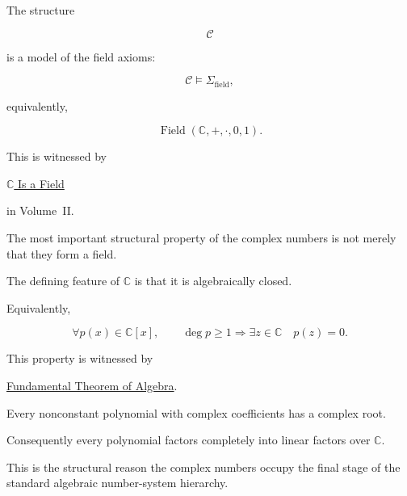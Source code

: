 \begin{remark*}[Satisfaction]

The structure

\[
\mathcal C
\]

is a model of the field axioms:

\[
\mathcal C
\models
\Sigma_{\mathrm{field}},
\]

equivalently,

\[
\operatorname{Field}
(\mathbb C,+,\cdot,0,1).
\]

This is witnessed by

\hyperref[thm:c-is-field]
{$\mathbb C$ Is a Field}

in Volume~II.

\end{remark*}


\begin{remark*}

The most important structural property of the complex numbers is not merely
that they form a field.

The defining feature of $\mathbb C$ is that it is algebraically closed.

Equivalently,

\[
\forall p(x)\in\mathbb C[x],
\qquad
\deg p \ge 1
\Longrightarrow
\exists z\in\mathbb C
\quad
p(z)=0.
\]

This property is witnessed by

\hyperref[thm:fundamental-theorem-of-algebra]
{Fundamental Theorem of Algebra}.

\end{remark*}

\begin{remark*}[Interpretation]

Every nonconstant polynomial with complex coefficients has a complex root.

Consequently every polynomial factors completely into linear factors over
$\mathbb C$.

This is the structural reason the complex numbers occupy the final stage of the
standard algebraic number-system hierarchy.

\end{remark*}


